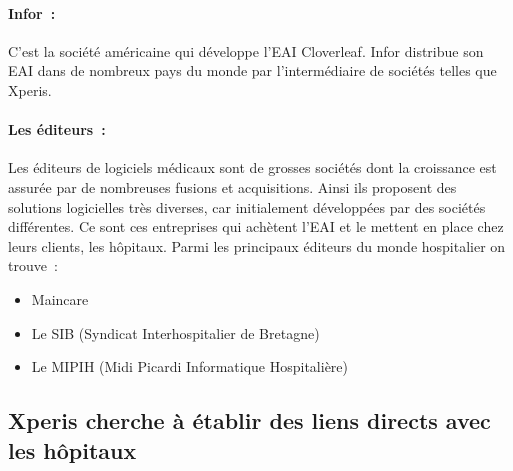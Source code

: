 			\paragraph{Infor~:}
			C'est la société américaine qui développe l'EAI Cloverleaf. Infor distribue
			son EAI dans de nombreux pays du monde par l'intermédiaire de sociétés
			telles que Xperis.
			
			\paragraph{Les éditeurs~:}
			Les éditeurs de logiciels médicaux sont de grosses sociétés dont la
			croissance est assurée par de nombreuses fusions et acquisitions. Ainsi ils
			proposent des solutions logicielles très diverses, car initialement
			développées par des sociétés différentes. Ce sont ces entreprises qui
			achètent l'EAI et le mettent en place chez leurs clients, les hôpitaux. Parmi
			les principaux éditeurs du monde hospitalier on trouve~:
			\begin{itemize}
				\item Maincare
				\item Le SIB (Syndicat Interhospitalier de Bretagne)
				\item Le MIPIH (Midi Picardi Informatique Hospitalière)
			\end{itemize}
			
		\subsection{Xperis cherche à établir des liens directs avec les hôpitaux}
